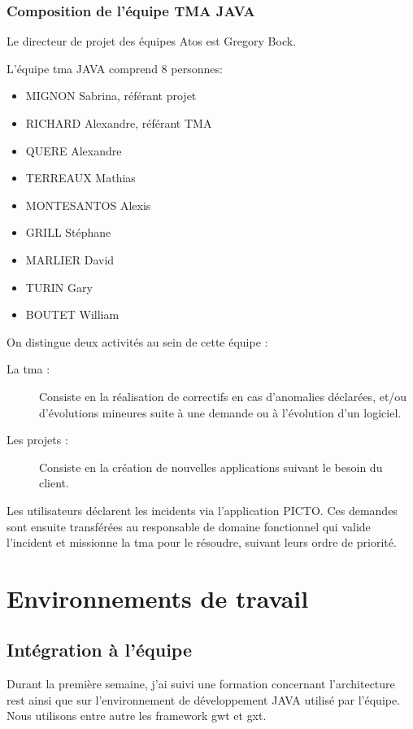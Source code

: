 \documentclass[12pt]{report}
\begin{document}
    \subsection{Composition de l'équipe TMA JAVA}
    Le directeur de projet des équipes Atos est Gregory Bock.
    
    L'équipe \gls{tma} JAVA comprend 8 personnes:\vspace{-1em}
    \begin{itemize}[itemsep=-0.5em]
        \item MIGNON Sabrina, référant projet
        \item RICHARD Alexandre, référant TMA
        \item QUERE Alexandre
        \item TERREAUX Mathias
        \item MONTESANTOS Alexis
        \item GRILL Stéphane
        \item MARLIER David
        \item TURIN Gary
        \item BOUTET William
    \end{itemize}
    On distingue deux activités au sein de cette équipe :\vspace{-1em}
    \begin{description}
        \item[La \gls{tma} :] Consiste en la réalisation de correctifs en cas d'anomalies déclarées, et/ou d'évolutions mineures suite à une demande ou à l'évolution d'un logiciel.
        \item[Les projets :] Consiste en la création de nouvelles applications suivant le besoin du client.
    \end{description}
    
    Les utilisateurs déclarent les incidents via l'application PICTO. Ces demandes sont ensuite transférées au responsable de domaine fonctionnel qui valide l’incident et missionne la \gls{tma} pour le résoudre, suivant leurs ordre de priorité.
    
    \chapter{Environnements de travail}
    
    \section{Intégration à l'équipe}
    Durant la première semaine, j'ai suivi une formation concernant l'architecture \acrshort{rest} ainsi que sur l'environnement de développement JAVA utilisé par l'équipe. Nous utilisons entre autre les framework \gls{gwt} et \gls{gxt}.
    
\end{document}
